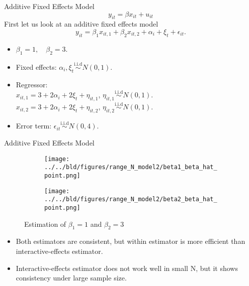 \documentclass{beamer}
\begin{document}
\begin{frame}{Additive Fixed Effects Model}
   {\color{gray}\footnotesize \[
        y_{it}= \beta x_{it}+u_{it}
    \]}
First let us look at an additive fixed effects model
$$
y_{it} = \beta_{1}x_{it,1}+\beta_{2}x_{it,2}+\alpha_{i}+\xi_{t}+\epsilon_{it}.
$$

\begin{itemize}
    \item $\beta_1=1, \quad \beta_2=3$.
    \item Fixed effects: $\alpha_{i}, \xi_{t}\stackrel{\text{i.i.d}}{\sim}N(0,1).$
    \item Regressor:\\
    $x_{it,1}=3+2\alpha_i+2\xi_t+\eta_{it,1}$, $\eta_{it,1} \stackrel{\text{i.i.d}}{\sim} N(0,1)$.  \\
    $x_{it,2}=3+2\alpha_i+2\xi_t+\eta_{it,2}$, $\eta_{it,2} \stackrel{\text{i.i.d}}{\sim} N(0,1)$.
    \item Error term: $\epsilon_{it}\stackrel{\text{i.i.d}}{\sim} N(0,4)$.

\end{itemize}

\end{frame}



\begin{frame}{Additive Fixed Effects Model}

\begin{figure}
\begin{subfigure}{.5\textwidth}
\centering
\texttt{[image: ../../bld/figures/range\_N\_model2/beta1\_beta\_hat\_point.png]}
\end{subfigure}%
\begin{subfigure}{.5\textwidth}
\centering
\texttt{[image: ../../bld/figures/range\_N\_model2/beta2\_beta\_hat\_point.png]}
\end{subfigure}%
\centering
\caption{Estimation of $\beta_1=1$ and $\beta_2=3$}
\end{figure}

\begin{itemize}
\item Both estimators are consistent, but within estimator is more efficient than interactive-effects estimator.
\item Interactive-effects estimator does not work well in small N, but it shows consistency under large sample size.
\end{itemize}

\end{frame}
\end{document}
